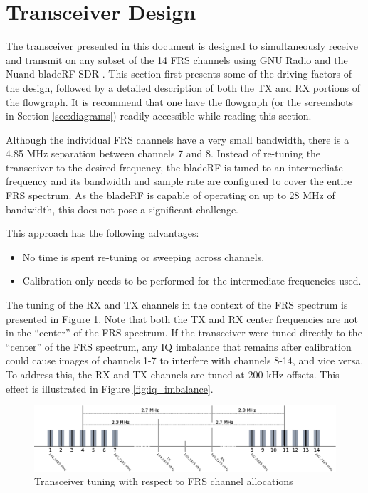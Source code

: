 \cleardoublepage

\section{Transceiver Design} \label{sec:design}

The transceiver presented in this document is designed to simultaneously receive
and transmit on any subset of the 14 \ac{FRS} channels using GNU Radio
\cite{GNURADIO} and the Nuand bladeRF \ac{SDR} \cite{BLADERF}.  This section
first presents some of the driving factors of the design,
followed by a detailed description of both the \ac{TX} and \ac{RX} portions
of the flowgraph. It is recommend that one have the flowgraph (or the
screenshots in Section \ref{sec:diagrams})  readily accessible while reading
this section.

Although the individual \ac{FRS} channels have a very small bandwidth, there is
a 4.85 MHz separation between channels 7 and 8. Instead of re-tuning the
transceiver to the desired frequency, the bladeRF is tuned to an intermediate
frequency and its bandwidth and sample rate are configured to cover the entire
\ac{FRS} spectrum. As the bladeRF is capable of operating on up to 28 MHz of
bandwidth, this does not pose a significant challenge.

This approach has the following advantages:
\begin{itemize}
  \item No time is spent re-tuning or sweeping across channels.
  \item Calibration only needs to be performed for the intermediate
        frequencies used.
\end{itemize}

The tuning of the \ac{RX} and \ac{TX} channels in the context of the
\ac{FRS} spectrum is presented in Figure \ref{fig:tuning}.  Note that both
the \ac{TX} and \ac{RX} center frequencies are not in the ``center'' of the
\ac{FRS} spectrum.  If the transceiver were tuned directly to the ``center''
of the \ac{FRS}
spectrum, any IQ imbalance that remains
after calibration could cause images of channels 1-7 to interfere with channels
8-14, and vice versa. To address this, the \ac{RX} and \ac{TX} channels are
tuned at 200 kHz offsets.  This effect is illustrated in Figure \ref{fig:iq_imbalance}.

\begin{figure}[h]
  \centering
  \includegraphics{images/frs/tuning.eps}
  \caption{Transceiver tuning with respect to FRS channel allocations}
  \label{fig:tuning}
\end{figure}

